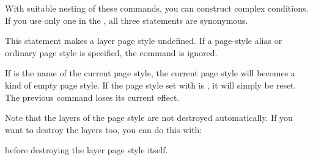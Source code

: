 With suitable nesting of these commands, you can construct complex conditions.
If you use only one  in the , all three
statements are synonymous.%
\EndIndexGroup


\begin{Declaration}
\end{Declaration}
%
%
\iftrue
This statement makes a layer page style undefined. If a page-style alias or
ordinary page style is specified, the command is ignored.
\else
With this command you can remove a the definition of a layer page style.
However, this only occurs if a layer page style named \PName{page style name}
exists. If, instead, it is a page-style alias, a different (non-layer) page
style, or not a page style at all, nothing happens; the command is ignored.%
\fi

If  is the name of the current page style, the current
page style will becomes a kind of empty page style. If the page style set with
 is , it will simply
be reset. The previous  command loses its
current effect.

Note that the layers of the page style are not destroyed
automatically. If you want to destroy the layers too, you can do this with:
\begin{lstcode}
\end{lstcode}
before destroying the layer page style itself.%
\EndIndexGroup
\EndIndexGroup


%
\EndIndexGroup

